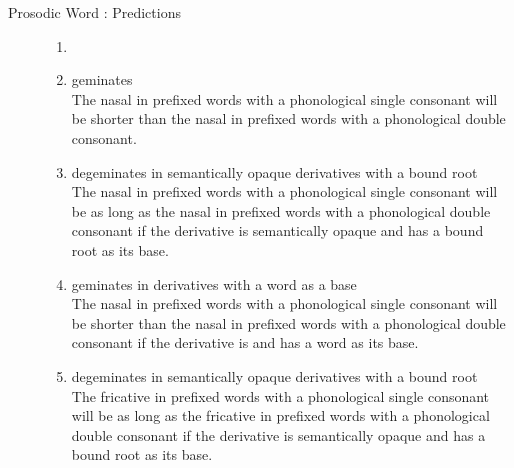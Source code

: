 \begin{description}
\item[Prosodic Word \citep{Raffelsiefen.1999}: Predictions]
\begin{enumerate}[leftmargin=*]
	\item[]
	\item {} geminates \\
	The nasal in prefixed words with a phonological single consonant will be shorter than the nasal in prefixed words with a phonological double consonant. 
	
	\item{} degeminates in semantically opaque derivatives with a bound root\\
	The nasal in prefixed words with a phonological single consonant will be as long as the nasal in prefixed words with a phonological double consonant if  the derivative is semantically opaque and has a bound root as its base.
	
	
	
	\item {} geminates in  derivatives with a word as a base \\
	The nasal in prefixed words with a phonological single consonant will be shorter than the nasal in prefixed words with a phonological double consonant if  the derivative is  and has a word as its base.
	
	
	\item {} degeminates in semantically opaque derivatives with a bound root\\
	The fricative in prefixed words with a phonological single consonant will be as long as the fricative in prefixed words with a phonological double consonant if  the derivative is semantically opaque and has a bound root as its base.
	

\end{enumerate}
\end{description}
